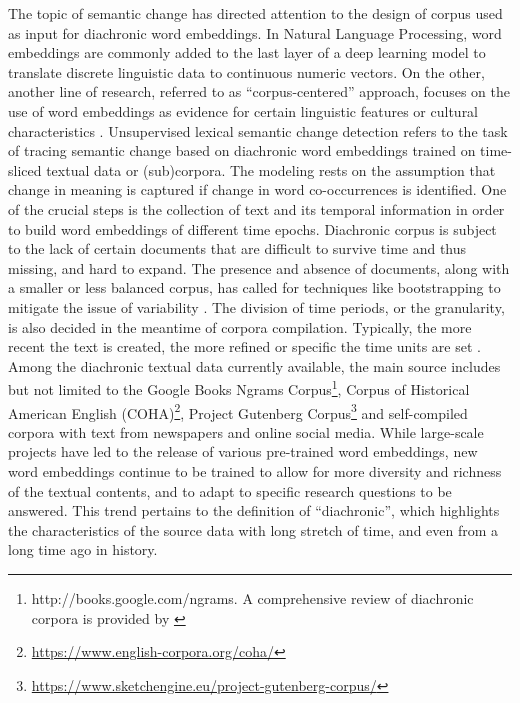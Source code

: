 The topic of semantic change has directed attention to the design of corpus used as input for diachronic word embeddings. In Natural Language Processing, word embeddings are commonly added to the last layer of a deep learning model to translate discrete linguistic data to continuous numeric vectors. On the other, another line of research, referred to as ``corpus-centered'' approach, focuses on the use of word embeddings as evidence for certain linguistic features or cultural characteristics \parencite{antoniak2018evaluating}. Unsupervised lexical semantic change detection refers to the task of tracing semantic change based on diachronic word embeddings trained on time-sliced textual data or (sub)corpora. The modeling rests on the assumption that change in meaning is captured if change in word co-occurrences is identified. One of the crucial steps is the collection of text and its temporal information in order to build word embeddings of different time epochs. Diachronic corpus is subject to the lack of certain documents that are difficult to survive time and thus missing, and hard to expand. The presence and absence of documents, along with a smaller or less balanced corpus, has called for techniques like bootstrapping to mitigate the issue of variability \parencite{antoniak2018evaluating}.  The division of time periods, or the granularity, is also decided in the meantime of corpora compilation. Typically, the more recent the text is created, the more refined or specific the time units are set \parencite{kutuzov2018survey}. Among the diachronic textual data currently available, the main source includes but not limited to the Google Books Ngrams Corpus\footnote{http://books.google.com/ngrams. A comprehensive review of diachronic corpora is provided by \textcite[38--41]{tahmasebi2018survey}}, Corpus of Historical American English (COHA)\footnote{\url{https://www.english-corpora.org/coha/}}, Project Gutenberg Corpus\footnote{\url{https://www.sketchengine.eu/project-gutenberg-corpus/}} and self-compiled corpora with text from newspapers and online social media. While large-scale projects have led to the release of various pre-trained word embeddings, new word embeddings continue to be trained to allow for more diversity and richness of the textual contents, and to adapt to specific research questions to be answered. This trend pertains to the definition of ``diachronic'', which highlights the characteristics of the source data with long stretch of time, and even from a long time ago in history.

